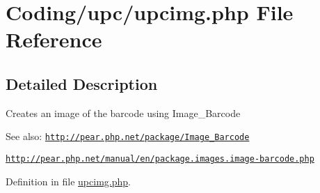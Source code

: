 \hypertarget{upcimg_8php}{
\section{Coding/upc/upcimg.php File Reference}
\label{upcimg_8php}
}


\subsection{Detailed Description}
Creates an image of the barcode using Image\_\-Barcode \begin{Desc}
\item[See also:]\href{http://pear.php.net/package/Image_Barcode}{\tt http://pear.php.net/package/Image\_\-Barcode} 

\href{http://pear.php.net/manual/en/package.images.image-barcode.php}{\tt http://pear.php.net/manual/en/package.images.image-barcode.php} \end{Desc}


Definition in file \hyperlink{upcimg_8php-source}{upcimg.php}.